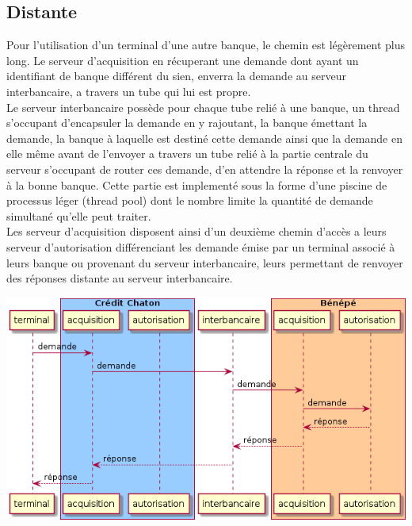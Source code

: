 \documentclass[french, a4paper, 12pt, titlepage]{article}
\begin{document}
\subsection{Distante}
Pour l'utilisation d'un terminal d'une autre banque, le chemin est légèrement plus long.
Le serveur d'acquisition en récuperant une demande dont ayant un identifiant de banque différent du sien, enverra la demande au serveur interbancaire, a travers un tube qui lui est propre.\\
\noindent
Le serveur interbancaire possède pour chaque tube relié à une banque, un thread s'occupant d'encapsuler la demande en y rajoutant, la banque émettant la demande, la banque à laquelle est destiné cette demande ainsi que la demande en elle même avant de l'envoyer a travers un tube relié à la partie centrale du serveur s'occupant de router ces demande, d'en attendre la réponse et la renvoyer à la bonne banque.
Cette partie est implementé sous la forme d'une piscine de processus léger (thread pool) dont le nombre limite la quantité de demande simultané qu'elle peut traiter.\\
\noindent
Les serveur d'acquisition disposent ainsi d'un deuxième chemin d'accès a leurs serveur d'autorisation différenciant les demande émise par un terminal associé à leurs banque ou provenant du serveur interbancaire, leurs permettant de renvoyer des réponses distante au serveur interbancaire.
\medskip
\begin{center}
\includegraphics[scale=0.6]{transactionDistante}
\end{center}
\medskip
\end{document}
